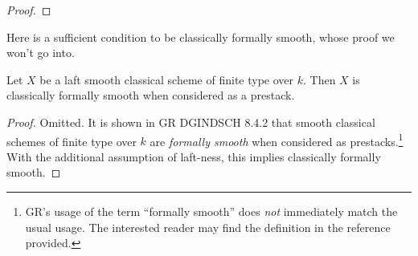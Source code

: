 \documentclass[./main.tex]{subfiles}
\begin{document}
\begin{proof}
\end{proof}

Here is a sufficient condition to be classically formally smooth,
whose proof we won't go into.

\begin{prop}
  
  Let $X$ be a laft smooth classical scheme of finite type over $k$.
  Then $X$ is classically formally smooth when considered as a prestack.
\end{prop}
\begin{proof}
  Omitted.
  It is shown in GR DGINDSCH 8.4.2 that 
  smooth classical schemes of finite type over $k$
  are \emph{formally smooth} when considered as prestacks.\footnote{
  GR's usage of the term ``formally smooth'' does \emph{not}
  immediately match the usual usage.
  The interested reader may find the definition in the reference provided.
}
With the additional assumption of laft-ness,
this implies classically formally smooth.
\end{proof}
\end{document}
